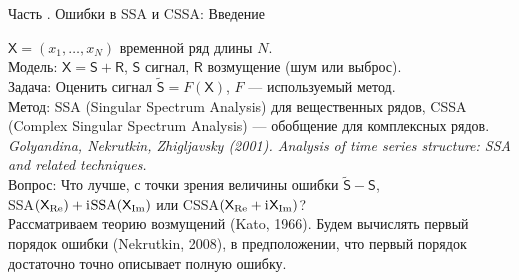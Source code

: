 \documentclass[10pt, ucs, notheorems, handout]{beamer}
\newcommand{\tX}[1]{\mathsf{#1}}
\newcommand{\iu}{\mathrm{i}\mkern1mu}
\newcommand{\RomanNumeralCaps}[1]
{\MakeUppercase{\romannumeral #1}}
\begin{document}
\begin{frame}{Часть \RomanNumeralCaps{2}. Ошибки в SSA и CSSA: Введение}
	
	$\tX{X} = (x_1, \ldots, x_{N})$ временной ряд длины $N$.\\
	\vspace{1em}
	\alert{Модель:} $\tX{X} = \tX{S} + \tX{R}$, $\tX{S}$ сигнал, $\tX{R}$ возмущение (шум или выброс).\\
	\vspace{1em}
	\alert{Задача:} Оценить сигнал $\tilde{\tX{S}} = F(\tX{X})$, $F$ --- используемый метод.\\
	\vspace{1em}
	\alert{Метод:} SSA (Singular Spectrum Analysis) для вещественных рядов, CSSA (Complex Singular Spectrum Analysis) --- обобщение для комплексных рядов.\\
	\textit{\small{Golyandina, Nekrutkin, Zhigljavsky (2001). Analysis of time series structure: SSA and
			related techniques.}}\\
	\vspace{1em}
	\alert{Вопрос:} Что лучше, с точки зрения величины ошибки $\tilde{\tX{S}} - \tX{S}$,\\
	SSA$(\tX{X}_{\Re}) + \iu \text{SSA}(\tX{X}_{\Im})$ или CSSA$(\tX{X}_{\Re} + \iu \tX{X}_{\Im})$?\\
	\vspace{1em}
	Рассматриваем теорию возмущений (Kato, 1966). Будем вычислять первый порядок ошибки (Nekrutkin, 2008), в предположении, что первый порядок достаточно точно описывает полную ошибку.
	
\end{frame}
\end{document}
